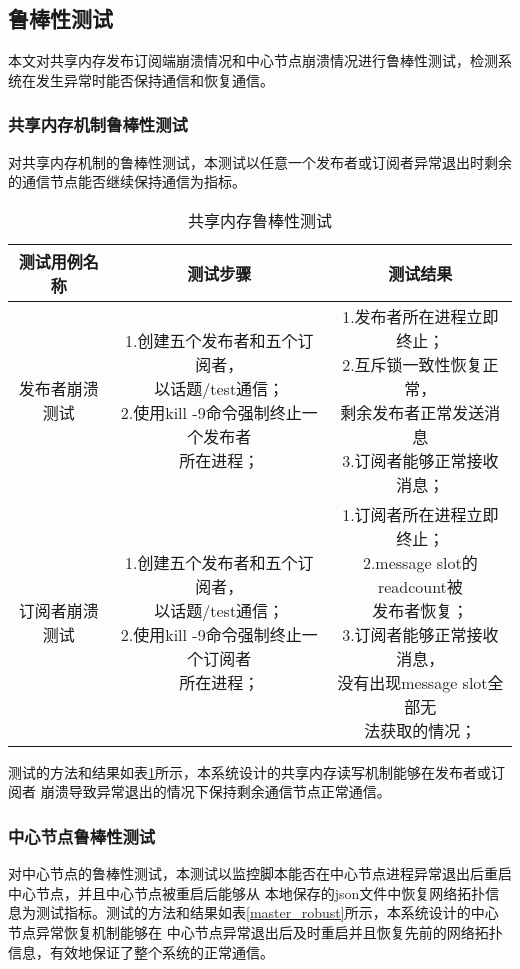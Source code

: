 \subsection{鲁棒性测试}
本文对共享内存发布订阅端崩溃情况和中心节点崩溃情况进行鲁棒性测试，检测系统在发生异常时能否保持通信和恢复通信。
\subsubsection{共享内存机制鲁棒性测试}
对共享内存机制的鲁棒性测试，本测试以任意一个发布者或订阅者异常退出时剩余的通信节点能否继续保持通信为指标。

\begin{table}[H]
  \centering\small
  \caption{共享内存鲁棒性测试}
  \renewcommand\arraystretch{1.2}
  \label{shared_memory_robust}
  \begin{tabular}{ccc}
    \toprule
    测试用例名称 & 测试步骤 & 测试结果 \\
    \midrule
    发布者崩溃测试 & \makecell[l]{1.创建五个发布者和五个订阅者，\\以话题/test通信；\\2.使用kill -9命令强制终止一个发布者\\所在进程；} & \makecell[l]{1.发布者所在进程立即终止；\\2.互斥锁一致性恢复正常，\\剩余发布者正常发送消息\\3.订阅者能够正常接收消息；}\\
    \hline
    订阅者崩溃测试 & \makecell[l]{1.创建五个发布者和五个订阅者，\\以话题/test通信；\\2.使用kill -9命令强制终止一个订阅者\\所在进程；} & \makecell[l]{1.订阅者所在进程立即终止；\\2.message slot的readcount被\\发布者恢复；\\3.订阅者能够正常接收消息，\\没有出现message slot全部无\\法获取的情况；} \\
    \bottomrule
  \end{tabular}
\end{table}
测试的方法和结果如表\ref{shared_memory_robust}所示，本系统设计的共享内存读写机制能够在发布者或订阅者
崩溃导致异常退出的情况下保持剩余通信节点正常通信。

\subsubsection{中心节点鲁棒性测试}
对中心节点的鲁棒性测试，本测试以监控脚本能否在中心节点进程异常退出后重启中心节点，并且中心节点被重启后能够从
本地保存的json文件中恢复网络拓扑信息为测试指标。测试的方法和结果如表\ref{master_robust}所示，本系统设计的中心节点异常恢复机制能够在
中心节点异常退出后及时重启并且恢复先前的网络拓扑信息，有效地保证了整个系统的正常通信。

